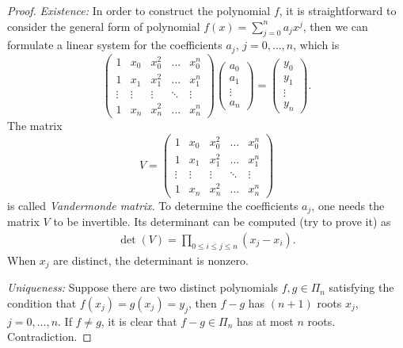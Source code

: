 \begin{proof}
   \noindent \emph{Existence: }In order to construct the polynomial $f$, it is straightforward to consider the general form of polynomial $f(x) = \sum_{j=0}^n a_j x^j$, then we can formulate a linear system for the coefficients $a_j$, $j=0,\dots, n$, which is 
    \begin{equation*}
        \begin{pmatrix}
            1 & x_0 & x_0^2 & \dots & x_0^n \\
            1 & x_1 & x_1^2 & \dots & x_1^n \\
            \vdots & \vdots &\vdots & \ddots & \vdots\\
            1 & x_n & x_n^2 & \dots & x_n^n
        \end{pmatrix} \begin{pmatrix}
            a_0\\a_1\\\vdots\\a_n
        \end{pmatrix} = \begin{pmatrix}
            y_0\\y_1\\\vdots \\y_n
        \end{pmatrix}.
    \end{equation*}
    The matrix 
    $$V = \begin{pmatrix}
        1 & x_0 & x_0^2 & \dots & x_0^n \\
        1 & x_1 & x_1^2 & \dots & x_1^n \\
        \vdots & \vdots &\vdots & \ddots & \vdots\\
        1 & x_n & x_n^2 & \dots & x_n^n
    \end{pmatrix} $$
    is called \emph{Vandermonde matrix}.
    To determine the coefficients $a_j$, one needs the matrix $V$ to be invertible. Its determinant can be computed (try to prove it) as
    \begin{eqnarray}
        \det(V) = \prod_{0\le i\le j\le n}(x_j - x_i).
    \end{eqnarray}
    When $x_j$ are distinct, the determinant is nonzero.

   \noindent \emph{Uniqueness: }
    Suppose there are two distinct polynomials $f, g\in \Pi_n$ satisfying the condition that $f(x_j) = g(x_j) = y_j$, then $f - g$ has $(n+1)$ roots $x_j$, $j=0, \dots, n$. If $f\neq g$, it is clear that $f-g\in\Pi_n$ has at most $n$ roots. Contradiction.
\end{proof}

